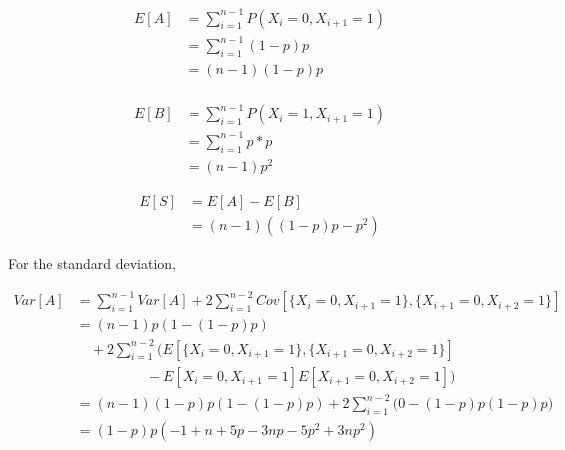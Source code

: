 \documentclass[12pt]{article}
\begin{document}
    \begin{equation*}
        \begin{split}
        E[A]& =\sum_{i=1}^{n-1}P(X_i=0,X_{i+1}=1) \\
            & =\sum_{i=1}^{n-1}(1-p)p \\
            & =(n-1)(1-p)p \\
        \end{split}
    \end{equation*}

    \begin{equation*}
        \begin{split}
        E[B]& =\sum_{i=1}^{n-1}P(X_i=1,X_{i+1}=1) \\
            & =\sum_{i=1}^{n-1}p*p \\
            & =(n-1)p^2
        \end{split}
    \end{equation*}

    \begin{equation*}
        \begin{split}
        E[S]& =E[A]-E[B] \\
            & =(n-1)\left((1-p)p-p^2\right)
        \end{split}
    \end{equation*}

    For the standard deviation,

    \begin{equation*}
        \begin{split}
        Var[A]& =\sum_{i=1}^{n-1}Var[A]+2\sum_{i=1}^{n-2}Cov[\{X_i=0,
                X_{i+1}=1\}, \{X_{i+1}=0, X_{i+2}=1\}] \\
              & =(n-1)p(1-(1-p)p) \\
              & \quad +2\sum_{i=1}^{n-2}\bigg(E[\{X_i=0, X_{i+1}=1\},
                \{X_{i+1}=0, X_{i+2}=1\}] \\
              & \qquad\qquad\quad -E[X_i=0,X_{i+1}=1]E[X_{i+1}=0,X_{i+2}=1]
                \bigg) \\
              & =(n-1)(1-p)p(1-(1-p)p)+2\sum_{i=1}^{n-2}\bigg(0-(1-p)p(1-p)p
                \bigg) \\
              & =(1-p)p(-1+n+5p-3np-5p^2+3np^2)
        \end{split}
    \end{equation*}
\end{document}
